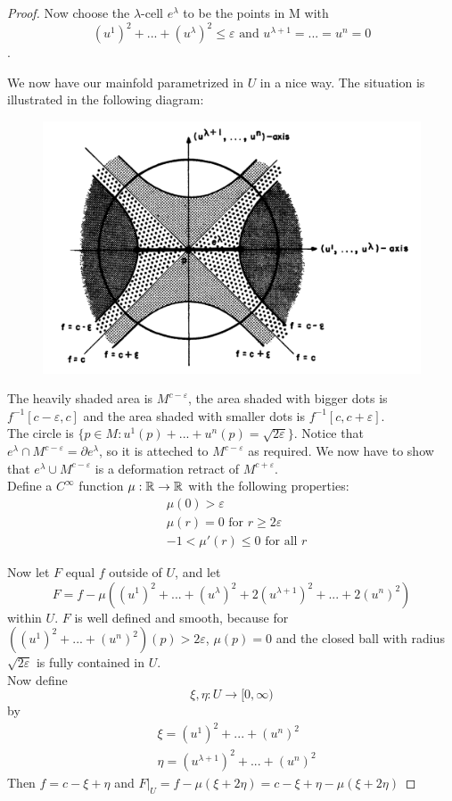 \begin{proof}
   Now choose the $\lambda$-cell $e^{\lambda}$ to be the points in M with
   \[ (u^1)^2 + ... + (u^{\lambda})^2 \leq \varepsilon 
   \text{ and } u^{\lambda + 1} = ... = u^n = 0 \].

   We now have our mainfold parametrized in $U$ in a nice way. The situation is
   illustrated in the following diagram:

   \begin{figure}[H]
      \centering
      \includegraphics[width=0.7\linewidth]{resources/Mil-Diagram5.png}
      \label{fig:mil-diagram5}
   \end{figure}

   The heavily shaded area is $M^{c-\varepsilon}$, the area shaded with bigger
   dots is $f^{-1}[c - \varepsilon, c]$ and the area shaded with smaller dots
   is $f^{-1}[c, c + \varepsilon]$. \\
   The circle is $\{ p \in M : u^1(p) + ... + u^n(p) = \sqrt{2\varepsilon} \}$.
   Notice that $e^\lambda \cap M^{c - \varepsilon} = \partial e^{\lambda}$, so
   it is atteched to $M^{c - \varepsilon}$ as required. We now have to show that
   $e^{\lambda} \cup M^{c - \varepsilon}$ is a deformation retract of 
   $M^{c + \varepsilon}$. \\
   Define a $C^{\infty}$ function $\mu : {\mathbb R} \rightarrow {\mathbb R}$ with the following
   properties:
   \begin{align*}
      & \mu(0) > \varepsilon \\
      & \mu(r) = 0 \text{ for } r \geq 2\varepsilon \\
      & -1 < \mu'(r) \leq 0 \text{ for all } r
   \end{align*}

   Now let $F$ equal $f$ outside of $U$, and let 
   \[ F = f - \mu((u^1)^2 + ... + (u^{\lambda})^2 + 2(u^{\lambda + 1})^2 + ... + 2(u^n)^2) \]
   within $U$. $F$ is well defined and smooth, because for 
   $ ((u^1)^2 + ... + (u^n)^2)(p) > 2\varepsilon $, $\mu(p) = 0$ and the closed
   ball with radius $\sqrt{2\varepsilon}$ is fully contained in $U$. \\
   Now define 
   \[ \xi, \eta: U \rightarrow [0, \infty) \]
   by
   \begin{align*}
      & \xi = (u^1)^2 + ... + (u^n)^2 \\
      & \eta = (u^{\lambda + 1})^2 + ... + (u^n)^2
   \end{align*}
   Then $f = c - \xi + \eta$ and $F|_U = f - \mu(\xi + 2\eta) = c - \xi + \eta - \mu(\xi + 2\eta)$


\end{proof}

